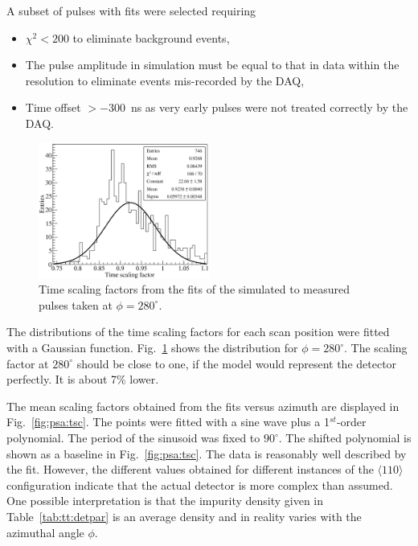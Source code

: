 A subset of pulses with fits were selected requiring
\begin{itemize}
\item $\chi^{2} < 200$ to eliminate background events,
\item The pulse amplitude in simulation must be equal to that in data
within the resolution to eliminate events mis-recorded by the DAQ,
\item Time offset $> -300$~ns as very early pulses were not treated
correctly by the DAQ.
\end{itemize}

\begin{figure}[htbp]
\centering
\includegraphics[width=0.5\textwidth]{tscale280}
\caption{Time scaling factors from the fits of the simulated to
measured pulses taken at $\phi=280^{\circ}$.}
\label{fig:psa:ts280}
\end{figure}
The distributions of the time scaling factors for each scan position
were fitted with a Gaussian function. Fig.~\ref{fig:psa:ts280} shows
the distribution for $\phi = 280^{\circ}$. The scaling factor at
$280^{\circ}$ should be close to one, if the model would represent the
detector perfectly. It is about 7\% lower. 

The mean scaling factors obtained from the fits versus azimuth are
displayed in Fig.~\ref{fig:psa:tsc}. The points were fitted with a
sine wave plus a 1$^{st}$-order polynomial. The period of the sinusoid
was fixed to $90^{\circ}$. The shifted polynomial is shown as a
baseline in Fig.~\ref{fig:psa:tsc}. The data is reasonably well
described by the fit. However, the different values obtained for
different instances of the $\langle 110 \rangle$ configuration
indicate that the actual detector is more complex than assumed. One
possible interpretation is that the impurity density given in
Table~\ref{tab:tt:detpar} is an average density and in reality varies
with the azimuthal angle $\phi$.

